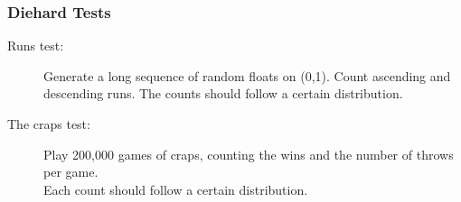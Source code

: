 \documentclass[MAIN.tex]{subfiles}
\begin{document}
\begin{frame}[fragile]
\frametitle{Diehard Tests}
\begin{description}
\item[Runs test:] Generate a long sequence of random floats on (0,1). Count ascending and descending runs. The counts should follow a certain distribution. \bigskip
\item[The craps test:] Play 200,000 games of craps, counting the wins and the number of throws per game. \\ Each count should follow a certain distribution.
\end{description}
\end{frame}
\end{document}
